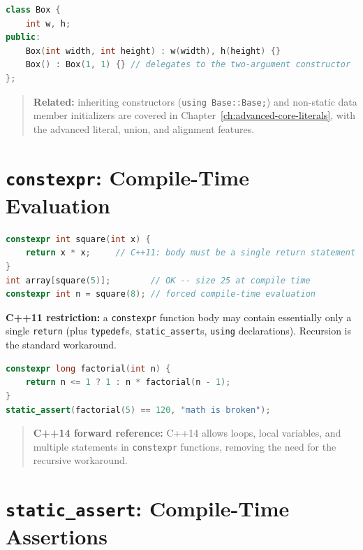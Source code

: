 \begin{lstlisting}[language=C++, caption={delegating constructors}]
class Box {
    int w, h;
public:
    Box(int width, int height) : w(width), h(height) {}
    Box() : Box(1, 1) {} // delegates to the two-argument constructor
};
\end{lstlisting}

\begin{quote}
\textbf{Related:} inheriting constructors (\texttt{using Base::Base;}) and non-static data member initializers are covered in Chapter~\ref{ch:advanced-core-literals}, with the advanced literal, union, and alignment features.
\end{quote}

\section{\texttt{constexpr}: Compile-Time Evaluation}

\begin{lstlisting}[language=C++, caption={a C++11 constexpr function}]
constexpr int square(int x) {
    return x * x;     // C++11: body must be a single return statement
}
int array[square(5)];        // OK -- size 25 at compile time
constexpr int n = square(8); // forced compile-time evaluation
\end{lstlisting}

\textbf{C++11 restriction:} a \texttt{constexpr} function body may contain essentially only a single \texttt{return} (plus \texttt{typedef}s, \texttt{static\_assert}s, \texttt{using} declarations). Recursion is the standard workaround.

\begin{lstlisting}[language=C++, caption={compile-time factorial via recursion}]
constexpr long factorial(int n) {
    return n <= 1 ? 1 : n * factorial(n - 1);
}
static_assert(factorial(5) == 120, "math is broken");
\end{lstlisting}

\begin{quote}
\textbf{C++14 forward reference:} C++14 allows loops, local variables, and multiple statements in \texttt{constexpr} functions, removing the need for the recursive workaround.
\end{quote}

\section{\texttt{static\_assert}: Compile-Time Assertions}

